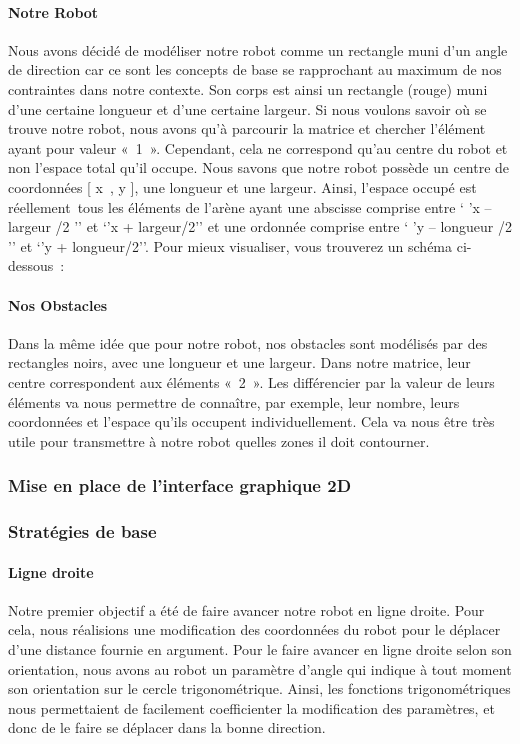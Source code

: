 \documentclass[12pt]{article}
\begin{document}
\paragraph{Notre Robot\\}
Nous avons décidé de modéliser notre robot comme un rectangle muni d’un angle de direction car ce sont les concepts de base se rapprochant au maximum de nos contraintes dans notre contexte. Son corps est ainsi un rectangle (rouge) muni d’une certaine longueur et d’une certaine largeur. Si nous voulons savoir où se trouve notre robot, nous avons qu’à parcourir la matrice et chercher l’élément ayant pour valeur « 1 ». Cependant, cela ne correspond qu’au centre du robot et non l’espace total qu’il occupe. Nous savons que notre robot possède un centre de coordonnées [ x , y ], une longueur et une largeur. Ainsi, l’espace occupé est réellement tous les éléments de l’arène ayant une abscisse comprise entre ‘ ’x – largeur /2 ’’ et ‘’x + largeur/2’’ et une ordonnée comprise entre ‘ ’y – longueur /2 ’’ et ‘’y + longueur/2’’. Pour mieux visualiser, vous trouverez un schéma ci-dessous :

\paragraph{Nos Obstacles\\}
Dans la même idée que pour notre robot, nos obstacles sont modélisés par des rectangles noirs, avec une longueur et une largeur. Dans notre matrice, leur centre correspondent aux éléments « 2 ». Les différencier par la valeur de leurs éléments va nous permettre de connaître, par exemple, leur nombre, leurs coordonnées et l’espace qu’ils occupent individuellement. Cela va nous être très utile pour transmettre à notre robot quelles zones il doit contourner.
\subsubsection{Mise en place de l'interface graphique 2D}
\subsubsection{Stratégies de base}
\paragraph{Ligne droite\\}
Notre premier objectif a été de faire avancer notre robot en ligne droite. Pour cela, nous réalisions une modification des coordonnées du robot pour le déplacer d'une distance fournie en argument. Pour le faire avancer en ligne droite selon son orientation, nous avons au robot un paramètre d'angle qui indique à tout moment son orientation sur le cercle trigonométrique. Ainsi, les fonctions trigonométriques nous permettaient de facilement coefficienter la modification des paramètres, et donc de le faire se déplacer dans la bonne direction.
\end{document}
